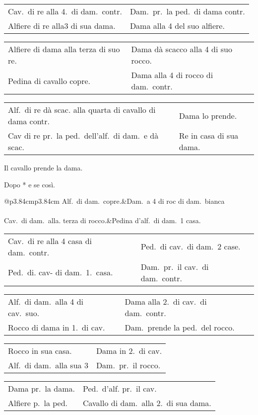 \documentclass[11pt,a6paper]{article}
\newcommand{\markerD}{{\small$\downuparrows$}}
\begin{document}
{\noindent\begin{tabular}{@{}p{3.84cm}p{3.84cm}}
Cav.\ di re alla 4.\ di dam.\ contr. &Dam.\ pr.\ la ped.\ di dama contr.\\
Alfiere di re alla3 di sua dama. & Dama alla 4 del suo alfiere.\\
\end{tabular}

\noindent\begin{tabular}{@{}p{3.84cm}p{3.84cm}}
Alfiere di dama alla terza di suo re. &Dama dà scacco alla 4 di suo rocco.\\
 Pedina di cavallo copre. &Dama alla 4 di rocco di dam.\ contr.\\
 \end{tabular}

\noindent\begin{tabular}{@{}p{3.84cm}p{3.84cm}}
Alf.\ di re dà scac. alla quarta di cavallo di dama contr. &Dama lo prende.\\
Cav di re pr.\ la ped.\ dell'alf.\ di dam.\ e dà scac. &Re in casa di sua dama.\\
\end{tabular}}

Il cavallo prende la dama.

Dopo * e se così.

{\small\noindent\begin{tabular}{@{}p{3.84cm}p{3.84cm}}
Alf.\ di dam.\ copre.&Dam.\ a 4 di roc di dam.\ bianca\\
\multicolumn{2}{@{}c}{\markerD}\\
Cav.\ di dam.\ alla. terza di rocco.&Pedina d'alf.\ di dam.\ 1 casa.\\
\end{tabular}

\noindent\begin{tabular}{@{}p{3.84cm}p{3.84cm}}
Cav.\ di re alla 4 casa di dam.\ contr. &Ped.\ di cav.\ di dam.\ 2 case.\\
Ped.\ di. cav- di dam.\ 1.\ casa. &Dam.\ pr.\ il cav.\ di dam.\ contr.\\
\end{tabular}

\noindent\begin{tabular}{@{}p{3.84cm}p{3.84cm}}
Alf.\ di dam.\ alla 4 di cav.\ suo. &Dama alla 2.\ di cav.\ di dam.\ contr.\\
Rocco di dama in 1.\ di cav.&Dam.\ prende la ped.\ del rocco.\\
\end{tabular}

\noindent\begin{tabular}{@{}p{3.84cm}p{3.84cm}}
Rocco in sua casa.&Dama in 2.\ di cav.\\
Alf.\ di dam.\ alla sua 3 &Dam.\ pr.\ il rocco.\\
\end{tabular}

\noindent\begin{tabular}{@{}p{3.84cm}p{3.84cm}}
Dama pr.\ la dama. &Ped.\ d'alf. pr.\ il cav.\\
Alfiere p.\ la ped. &Cavallo di dam.\ alla 2.\ di sua dama.\\
\end{tabular}}
\end{document}
